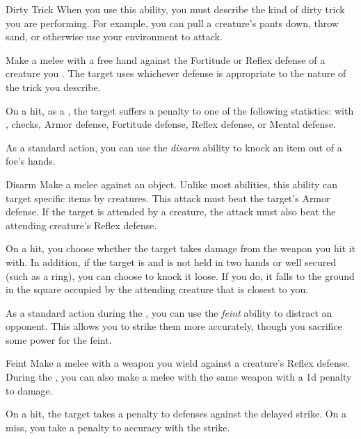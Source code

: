         \begin{freeability}{Dirty Trick}\label{Dirty Trick}
            When you use this ability, you must describe the kind of dirty trick you are performing.
            For example, you can pull a creature's pants down, throw sand, or otherwise use your environment to attack.

            Make a melee  with a free hand against the Fortitude or Reflex defense of a creature you .
            The target uses whichever defense is appropriate to the nature of the trick you describe.

            On a hit, as a , the target suffers a  penalty to one of the following statistics:
                 with ,  checks, Armor defense, Fortitude defense, Reflex defense, or Mental defense.
        \end{freeability}

         As a standard action, you can use the \textit{disarm} ability to knock an item out of a foe's hands.

        \begin{freeability}{Disarm}\label{Disarm}
            Make a melee  against an object.
            Unlike most abilities, this ability can target specific items  by creatures.
            This attack must beat the target's Armor defense.
            If the target is attended by a creature, the attack must also beat the attending creature's Reflex defense.

            On a hit, you choose whether the target takes damage from the weapon you hit it with.
            In addition, if the target is  and is not held in two hands or well secured (such as a ring), you can choose to knock it loose.
            If you do, it falls to the ground in the square occupied by the attending creature that is closest to you.
        \end{freeability}

         As a standard action during the , you can use the \textit{feint} ability to distract an opponent.
        This allows you to strike them more accurately, though you sacrifice some power for the feint.

        \begin{freeability}{Feint}\label{Feint}
            Make a melee  with a weapon you wield against a creature's Reflex defense.
            During the , you can also make a melee  with the same weapon with a \minus1d penalty to damage.

            On a hit, the target takes a  penalty to defenses against the delayed strike.
            On a miss, you take a  penalty to accuracy with the strike.
        \end{freeability}

